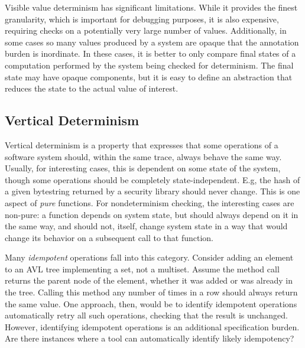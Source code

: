 Visible value determinism has significant limitations.  While it
provides the finest granularity, which is
important for debugging purposes, it is also expensive, requiring
checks on a potentially very large number of
values.  Additionally, in some cases so many values produced by a
system are opaque that the annotation burden is inordinate.  In these
cases, it is better to only compare final states of a computation
performed by the system being checked for determinism.  The final
state may have opaque components, but it is easy to define an
abstraction that reduces the state to the actual value of interest.



\subsection{Vertical Determinism}

Vertical determinism is a property that expresses that some operations
of a software system should, within the same trace, always behave the
same way.  Usually, for interesting cases, this is dependent on some
state of the system, though some operations should be completely
state-independent.  E.g, the hash of a given bytestring returned by a
security library should never change.  This is one aspect of
\emph{pure} functions.  For nondeterminism checking, the interesting
cases are non-pure: a function depends on system state, but should
always depend on it in the same way, and should not, itself, change
system state in a way that would change its behavior on a subsequent
call to that function.

Many \emph{idempotent} operations fall into this category.
Consider adding an element to an AVL tree implementing a set, not a
multiset.  Assume the method call returns the parent node of the
element, whether it was added or was already in the tree.  Calling
this method any number of times in a row should always return the
same value.  One approach, then, would be to identify
idempotent operations 
automatically retry all such operations, checking that the
result is unchanged.  However, identifying idempotent operations is an additional specification burden.  Are there instances where a tool
can automatically identify likely idempotency?


